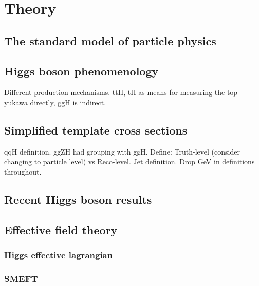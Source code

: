 \chapter{Theory}
\label{chap:theory}

\section{The standard model of particle physics}

\section{Higgs boson phenomenology}
Different production mechanisms. ttH, tH as means for measuring the top yukawa directly, ggH is indirect.

\section{Simplified template cross sections}\label{sec:theory_stxs}
qqH definition. ggZH had grouping with ggH. Define: Truth-level (consider changing to particle level) vs Reco-level. Jet definition. Drop GeV in definitions throughout.

\section{Recent Higgs boson results}

\section{Effective field theory}
\subsection{Higgs effective lagrangian}

\subsection{SMEFT}